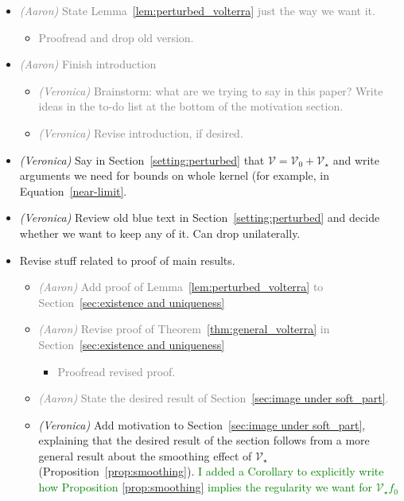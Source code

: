 \documentclass{article}
\theoremstyle{plain}
\newcommand{\volterra}{\mathcal{V}}
\newcommand{\hardpart}{\mathcal{V}_0}
\newcommand{\softpart}{\mathcal{V}_\star}
\newenvironment{brainstorm}{\color{violet}\begin{itemize}}{\end{itemize}\color{black}}
\begin{document}
\begin{brainstorm}
{\begin{itemize}
\end{itemize}}
\item \textcolor{gray}{\textit{(Aaron)} State Lemma~\ref{lem:perturbed_volterra} just the way we want it.}
\begin{itemize}
    \item \textcolor{gray}{Proofread and drop old version.}
\end{itemize}
\item \textcolor{gray}{\textit{(Aaron)} Finish introduction}
\begin{itemize}
\item \textcolor{gray}{\textit{(Veronica)} Brainstorm: what are we trying to say in this paper? Write ideas in the to-do list at the bottom of the motivation section.}
\item \textcolor{gray}{\textit{(Veronica)} Revise introduction, if desired.}
\end{itemize}
\color{gray}
\item \textit{(Veronica)} Say in Section~\ref{setting:perturbed} that $\volterra = \hardpart + \softpart$ and write arguments we need for bounds on whole kernel (for example, in Equation~\ref{near-limit}.
\color{gray}
\item \textit{(Veronica)} Review old blue text in Section~\ref{setting:perturbed} and decide whether we want to keep any of it. Can drop unilaterally. 
\color{violet}
\item Revise stuff related to proof of main results.
\begin{itemize}
        \item \textcolor{gray}{\textit{(Aaron)} Add proof of Lemma~\ref{lem:perturbed_volterra} to Section~\ref{sec:existence and uniqueness}}
        \item \textcolor{gray}{\textit{(Aaron)} Revise proof of Theorem~\ref{thm:general_volterra} in Section~\ref{sec:existence and uniqueness}}
        \begin{itemize}
            \item \textcolor{gray}{Proofread revised proof.}
        \end{itemize}
        \item \textcolor{gray}{\textit{(Aaron)} State the desired result of Section~\ref{sec:image under soft_part}.}
        \color{gray}
        \item \textit{(Veronica)} Add motivation to Section~\ref{sec:image under soft_part}, explaining that the desired result of the section follows from a more general result about the smoothing effect of $\softpart$ (Proposition~\ref{prop:smoothing}). \textcolor{green}{I added a Corollary to explicitly write how Proposition \ref{prop:smoothing} implies the regularity we want for $\softpart f_0$}

\end{itemize}
\end{brainstorm}
\end{document}
